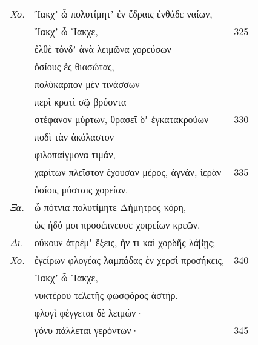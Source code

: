 \documentclass[13pt]{article}
\begin{document}
\begin{greek}
\newpage
\begin{spacing}{1.5}
\begin{tabularx}{\textwidth}{@{}lXr@{}}
\textit{Χο.} & Ἴακχʼ ὦ πολυτίμητʼ ἐν ἕδραις ἐνθάδε ναίων, &  \\
& Ἴακχʼ ὦ Ἴακχε, & 325 \\
& ἐλθὲ τόνδʼ ἀνὰ λειμῶνα χορεύσων &  \\
& ὁσίους ἐς θιασώτας, &  \\
& πολύκαρπον μὲν τινάσσων &  \\
& περὶ κρατὶ σῷ βρύοντα &  \\
& στέφανον μύρτων, θρασεῖ δʼ ἐγκατακρούων & 330 \\
& ποδὶ τὰν ἀκόλαστον &  \\
& φιλοπαίγμονα τιμάν, &  \\
& χαρίτων πλεῖστον ἔχουσαν μέρος, ἁγνάν, ἱερὰν & 335 \\
& ὁσίοις μύσταις χορείαν. &  \\
\textit{Ξα.} & ὦ πότνια πολυτίμητε Δήμητρος κόρη, &  \\
& ὡς ἡδύ μοι προσέπνευσε χοιρείων κρεῶν. &  \\
\textit{Δι.} & οὔκουν ἀτρέμʼ ἕξεις, ἤν τι καὶ χορδῆς λάβῃς; &  \\
\textit{Χο.} & ἐγείρων φλογέας λαμπάδας ἐν χερσὶ προσήκεις, & 340 \\
& Ἴακχʼ ὦ Ἴακχε, &  \\
& νυκτέρου τελετῆς φωσφόρος ἀστήρ. &  \\
& φλογὶ φέγγεται δὲ λειμών· &  \\
& γόνυ πάλλεται γερόντων· & 345 \\

\end{tabularx}
\end{spacing}


\end{greek}
\end{document}

